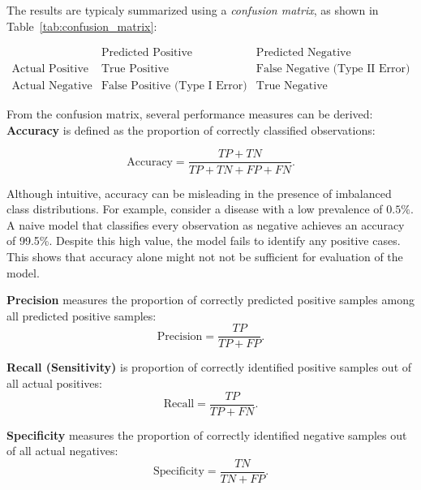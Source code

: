 The results are typicaly summarized using a \textit{confusion matrix}, \break as shown in Table~\ref{tab:confusion_matrix}:


\begin{table}[h!]
\centering
\[
\begin{array}{c|cc}
 & \text{Predicted Positive} & \text{Predicted Negative} \\
\hline
\text{Actual Positive} 
    & \text{True Positive} 
    & \text{False Negative (Type II Error)} \\
\text{Actual Negative} 
    & \text{False Positive (Type I Error)} 
    & \text{True Negative}
\end{array}
\]
\caption{Confusion matrix.}
\label{tab:confusion_matrix}
\end{table}

From the confusion matrix, several performance measures can be derived: \\

\textbf{Accuracy} is defined as the proportion of correctly classified observations: 

\begin{equation*}
    \text{Accuracy} = \frac{TP + TN}{TP + TN + FP + FN}.
\end{equation*}

Although intuitive, accuracy can be misleading in the presence of imbalanced class distributions. For example, consider a disease with a low prevalence of $0.5\%$. A naive model that classifies every observation as negative achieves an accuracy of 99.5\%. Despite this high value, the model fails to identify any positive cases. This shows that accuracy alone might not not be sufficient for evaluation of the model. 

\textbf{Precision} measures the proportion of correctly predicted positive samples among all predicted positive samples:
\begin{equation*}
    \text{Precision} = \frac{TP}{TP + FP}.
\end{equation*}

\textbf{Recall (Sensitivity)} is proportion of correctly identified positive samples out of all actual positives: 
\begin{equation*}
    \text{Recall} = \frac{TP}{TP + FN}.
\end{equation*}

\textbf{Specificity} measures the proportion of correctly identified negative samples out of all actual negatives:
\begin{equation*}
    \text{Specificity} = \frac{TN}{TN + FP}.
\end{equation*}

